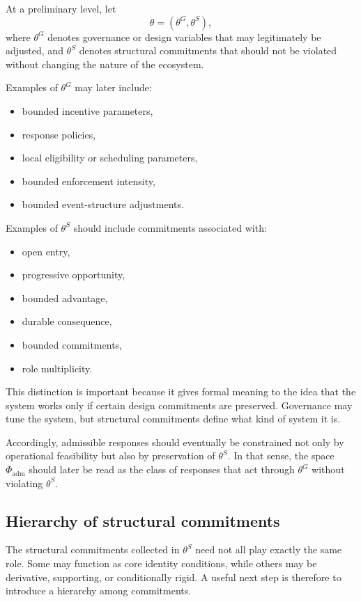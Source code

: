 \documentclass[11pt]{article}
\begin{document}
At a preliminary level, let
\[
\theta = (\theta^{G}, \theta^{S}),
\]
where \(\theta^{G}\) denotes governance or design variables that may legitimately be adjusted, and \(\theta^{S}\) denotes structural commitments that should not be violated without changing the nature of the ecosystem.

Examples of \(\theta^{G}\) may later include:
\begin{itemize}
  \item bounded incentive parameters,
  \item response policies,
  \item local eligibility or scheduling parameters,
  \item bounded enforcement intensity,
  \item bounded event-structure adjustments.
\end{itemize}

Examples of \(\theta^{S}\) should include commitments associated with:
\begin{itemize}
  \item open entry,
  \item progressive opportunity,
  \item bounded advantage,
  \item durable consequence,
  \item bounded commitments,
  \item role multiplicity.
\end{itemize}

This distinction is important because it gives formal meaning to the idea that the system works only if certain design commitments are preserved. Governance may tune the system, but structural commitments define what kind of system it is.

Accordingly, admissible responses should eventually be constrained not only by operational feasibility but also by preservation of \(\theta^{S}\). In that sense, the space \(\Phi_{\mathrm{adm}}\) should later be read as the class of responses that act through \(\theta^{G}\) without violating \(\theta^{S}\).

\subsection{Hierarchy of structural commitments}

The structural commitments collected in \(\theta^{S}\) need not all play exactly the same role. Some may function as core identity conditions, while others may be derivative, supporting, or conditionally rigid. A useful next step is therefore to introduce a hierarchy among commitments.
\end{document}
